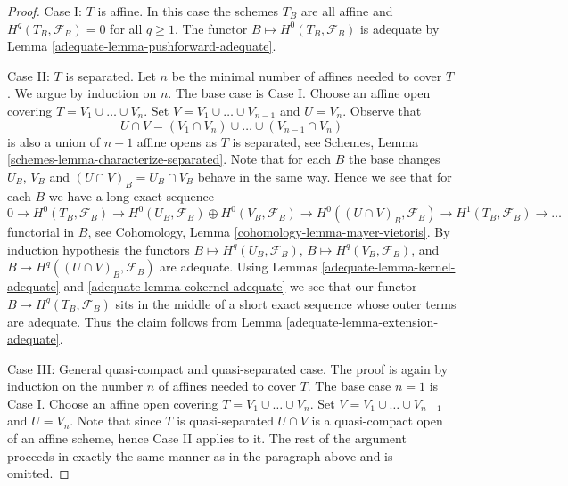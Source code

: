 \begin{proof}
\medskip\noindent
Case I: $T$ is affine. In this case the schemes $T_B$ are all affine
and $H^q(T_B, \mathcal{F}_B) = 0$ for all $q \geq 1$.
The functor $B \mapsto H^0(T_B, \mathcal{F}_B)$ is adequate by
Lemma \ref{adequate-lemma-pushforward-adequate}.

\medskip\noindent
Case II: $T$ is separated. Let $n$ be the minimal number of affines needed
to cover $T$. We argue by induction on $n$. The base case is Case I.
Choose an affine open covering $T = V_1 \cup \ldots \cup V_n$.
Set $V = V_1 \cup \ldots \cup V_{n - 1}$ and $U = V_n$. Observe that
$$
U \cap V = (V_1 \cap V_n) \cup \ldots \cup (V_{n - 1} \cap V_n)
$$
is also a union of $n - 1$ affine opens as $T$ is separated, see
Schemes, Lemma \ref{schemes-lemma-characterize-separated}.
Note that for each $B$ the base changes $U_B$, $V_B$ and
$(U \cap V)_B = U_B \cap V_B$ behave in the same way. Hence we see that
for each $B$ we have a long exact sequence
$$
0 \to
H^0(T_B, \mathcal{F}_B) \to
H^0(U_B, \mathcal{F}_B) \oplus H^0(V_B, \mathcal{F}_B) \to
H^0((U \cap V)_B, \mathcal{F}_B) \to
H^1(T_B, \mathcal{F}_B) \to \ldots
$$
functorial in $B$, see
Cohomology, Lemma \ref{cohomology-lemma-mayer-vietoris}.
By induction hypothesis the functors
$B \mapsto H^q(U_B, \mathcal{F}_B)$,
$B \mapsto H^q(V_B, \mathcal{F}_B)$, and
$B \mapsto H^q((U \cap V)_B, \mathcal{F}_B)$
are adequate. Using
Lemmas \ref{adequate-lemma-kernel-adequate} and
\ref{adequate-lemma-cokernel-adequate}
we see that our functor $B \mapsto H^q(T_B, \mathcal{F}_B)$ sits in the
middle of a short exact sequence whose outer terms are adequate.
Thus the claim follows from
Lemma \ref{adequate-lemma-extension-adequate}.

\medskip\noindent
Case III: General quasi-compact and quasi-separated case.
The proof is again by induction on the number $n$ of affines needed to
cover $T$. The base case $n = 1$ is Case I.
Choose an affine open covering $T = V_1 \cup \ldots \cup V_n$.
Set $V = V_1 \cup \ldots \cup V_{n - 1}$ and $U = V_n$. Note that
since $T$ is quasi-separated $U \cap V$ is a quasi-compact open of an
affine scheme, hence Case II applies to it. The rest of the argument
proceeds in exactly the same manner as in the paragraph above and is
omitted.
\end{proof}

